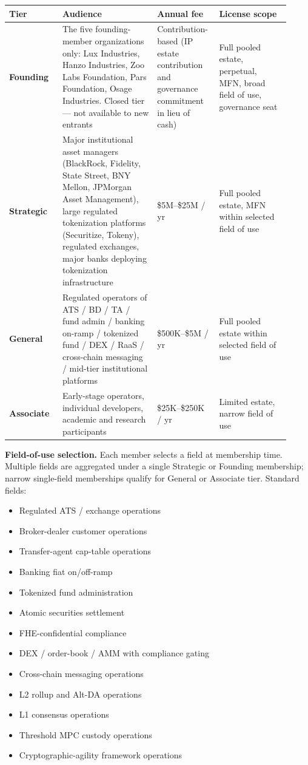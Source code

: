 \documentclass[11pt,letterpaper]{article}
\begin{document}
\begin{longtable}{p{0.18\linewidth}p{0.32\linewidth}p{0.18\linewidth}p{0.24\linewidth}}
\toprule
\textbf{Tier} & \textbf{Audience} & \textbf{Annual fee} & \textbf{License scope} \\
\midrule
\textbf{Founding} & The five founding-member organizations only: Lux Industries, Hanzo Industries, Zoo Labs Foundation, Pars Foundation, Osage Industries. Closed tier --- not available to new entrants & Contribution-based (IP estate contribution and governance commitment in lieu of cash) & Full pooled estate, perpetual, MFN, broad field of use, governance seat \\
\textbf{Strategic} & Major institutional asset managers (BlackRock, Fidelity, State Street, BNY Mellon, JPMorgan Asset Management), large regulated tokenization platforms (Securitize, Tokeny), regulated exchanges, major banks deploying tokenization infrastructure & \$5M--\$25M / yr & Full pooled estate, MFN within selected field of use \\
\textbf{General} & Regulated operators of ATS / BD / TA / fund admin / banking on-ramp / tokenized fund / DEX / RaaS / cross-chain messaging / mid-tier institutional platforms & \$500K--\$5M / yr & Full pooled estate within selected field of use \\
\textbf{Associate} & Early-stage operators, individual developers, academic and research participants & \$25K--\$250K / yr & Limited estate, narrow field of use \\
\bottomrule
\end{longtable}

\textbf{Field-of-use selection.} Each member selects a field at membership time. Multiple fields are aggregated under a single Strategic or Founding membership; narrow single-field memberships qualify for General or Associate tier. Standard fields:

\begin{itemize}
\item Regulated ATS / exchange operations
\item Broker-dealer customer operations
\item Transfer-agent cap-table operations
\item Banking fiat on/off-ramp
\item Tokenized fund administration
\item Atomic securities settlement
\item FHE-confidential compliance
\item DEX / order-book / AMM with compliance gating
\item Cross-chain messaging operations
\item L2 rollup and Alt-DA operations
\item L1 consensus operations
\item Threshold MPC custody operations
\item Cryptographic-agility framework operations
\end{itemize}
\end{document}
